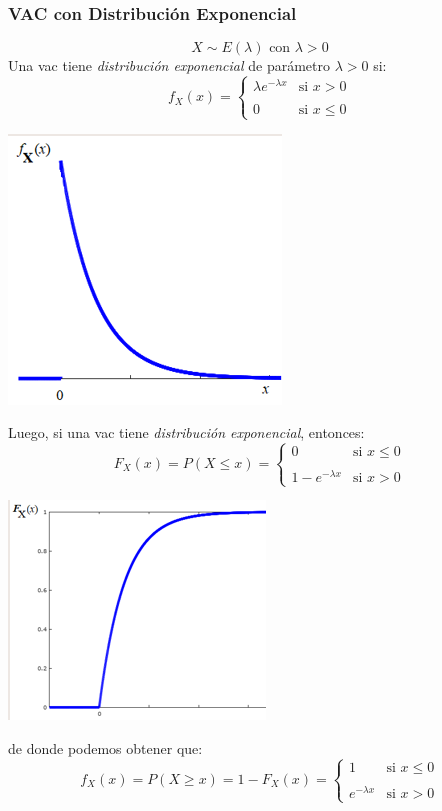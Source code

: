 \documentclass{article}
\begin{document}
\subsubsection{VAC con Distribución Exponencial}
\begin{equation*}
    X \sim E(\lambda) \text{ con } \lambda > 0
\end{equation*}
Una vac tiene \emph{distribución exponencial} de parámetro $\lambda > 0$ si:
\begin{equation*}
    f_X(x) =\left\{ \begin{array}{lcc}
             \lambda e^{-\lambda x}&  \text{si } x > 0 \\
             \\ 0 & \text{si } x \leq 0
             \end{array}
   \right.
\end{equation*}
\begin{center}
        \includegraphics[width=.25\textwidth]{Images/VACExp.png}
    \end{center} 
Luego, si una vac tiene \emph{distribución exponencial}, entonces:
\begin{equation*}
    F_X(x) = P(X \leq x) =\left\{ \begin{array}{lcc}
             0&  \text{si } x \leq 0 \\
             \\ 1 - e^{-\lambda x}& \text{si } x > 0
             \end{array}
   \right.
\end{equation*}
\begin{center}
        \includegraphics[width=.25\textwidth]{Images/VACExp2.png}
    \end{center} 
de donde podemos obtener que:
\begin{equation*}
    f_X(x) = P(X \geq x) = 1 - F_X(x) = \left\{ \begin{array}{lcc}
             1&  \text{si } x \leq 0 \\
             \\ e^{-\lambda x}& \text{si } x > 0
             \end{array}
   \right.
\end{equation*}
\end{document}
